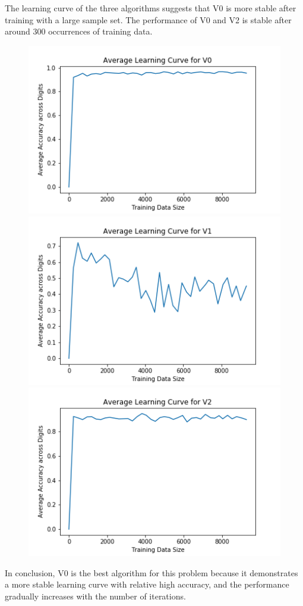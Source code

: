 \documentclass[twoside,11pt]{homework}
\begin{document}
	The learning curve of the three algorithms suggests that V0 is more stable after training with a large sample set. 
	The performance of V0 and V2 is stable after around 300 occurrences of training data.
	\begin{figure}[H]
		\includegraphics[scale=0.6]{q6/img/learning_v0.png}\\
		\includegraphics[scale=0.6]{q6/img/learning_v1.png}\\
		\includegraphics[scale=0.6]{q6/img/learning_v2.png}
	\end{figure}
	In conclusion, V0 is the best algorithm for this problem because it demonstrates a more stable learning curve with relative high
	accuracy, and the performance gradually increases with the number of iterations. 
\end{document}
